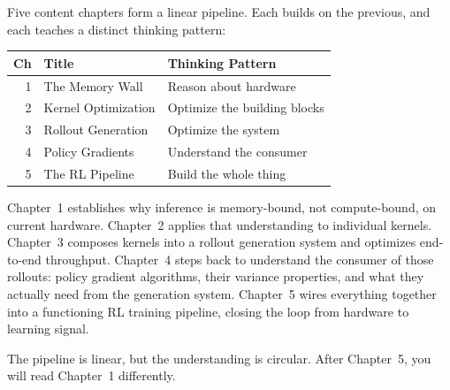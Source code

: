 Five content chapters form a linear pipeline. Each builds on the previous, and each teaches a distinct thinking pattern:

\medskip
\begin{center}
\begin{tabular}{@{}rll@{}}
\toprule
\textbf{Ch} & \textbf{Title} & \textbf{Thinking Pattern} \\
\midrule
1 & The Memory Wall      & Reason about hardware \\
2 & Kernel Optimization   & Optimize the building blocks \\
3 & Rollout Generation    & Optimize the system \\
4 & Policy Gradients      & Understand the consumer \\
5 & The RL Pipeline       & Build the whole thing \\
\bottomrule
\end{tabular}
\end{center}
\medskip

Chapter~1 establishes why inference is memory-bound, not compute-bound, on current hardware. Chapter~2 applies that understanding to individual kernels. Chapter~3 composes kernels into a rollout generation system and optimizes end-to-end throughput. Chapter~4 steps back to understand the consumer of those rollouts: policy gradient algorithms, their variance properties, and what they actually need from the generation system. Chapter~5 wires everything together into a functioning RL training pipeline, closing the loop from hardware to learning signal.

The pipeline is linear, but the understanding is circular. After Chapter~5, you will read Chapter~1 differently.
